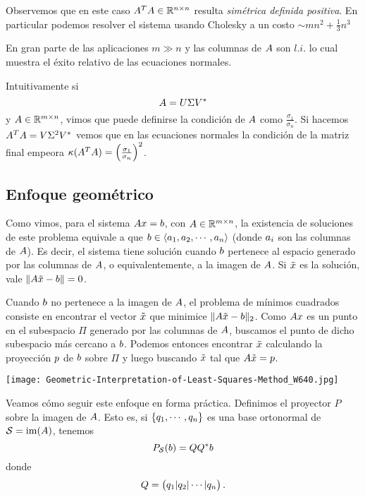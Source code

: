 Observemos que en este caso $\Ab^T\Ab\in \Rnn$ resulta \emph{simétrica definida positiva}.
En particular podemos resolver el sistema usando Cholesky a un costo $\sim mn^2+ \frac{1}{3}n^{3}$

En gran parte de las aplicaciones $m \gg n$ y las columnas de $\Ab$ son $l.i.$ lo cual muestra el éxito relativo de las ecuaciones normales.

Intuitivamente si
$$
\Ab=\Ub\Sigmab\Vb^*
$$
y $\Ab\in \R^{m\times n}$, vimos que puede definirse la condición de $\Ab$ como $\frac{\sigma_1}{\sigma_n}$. Si hacemos $\Ab^T\Ab=\Vb\Sigmab^2\Vb^*$ vemos que en las ecuaciones normales la condición de la matriz final empeora $\kappa(\Ab^T\Ab)=\left(\frac{\sigma_1}{\sigma_n}\right)^2$.


\subsection{Enfoque geométrico}

Como vimos, para el sistema $\Ab\xb=\bb$, con $\Ab\in \Rmn$, la existencia de soluciones de este problema equivale a que
$\bb\in \langle \ab_1,  \ab_2,\cdots , \ab_n\rangle$ (donde $\ab_{i}$ son las columnas de $\Ab$). Es decir, el sistema tiene solución cuando $\bb$ pertenece al espacio generado por las columnas de $\Ab$, o equivalentemente, a la imagen de $\Ab$. Si $\tilde \xb$ es la solución, vale $\|\Ab \tilde \xb - \bb\| = 0$.

Cuando $\bb$ no pertenece a la imagen de $\Ab$, el problema de mínimos cuadrados consiste en encontrar el vector $\tilde \xb$ que minimice $\|\Ab \tilde \xb - \bb\|_2$. Como $\Ab \xb$ es un punto en el subespacio $\Pi$ generado por las columnas de $\Ab$, buscamos el punto de dicho subespacio más cercano a $\bb$.
Podemos entonces encontrar $\tilde \xb$ calculando la proyección $\pb$ de $\bb$ sobre $\Pi$ y luego buscando $\tilde \xb$ tal que $\Ab \tilde \xb = \pb$.

\begin{center}
\texttt{[image: Geometric-Interpretation-of-Least-Squares-Method\_W640.jpg]}
\end{center}

Veamos cómo seguir este enfoque en forma práctica. Definimos el proyector $P$ sobre la imagen de $\Ab$. Esto es, si $\{\qb_1,\cdots,\qb_n\}$ es una base ortonormal de $\mathcal{S}=\im(\Ab)$, tenemos
$$
P_{\mathcal{S}}(\bb)=\Qb\Qb^*\bb
$$
donde
$$
\Qb=
\begin{pmatrix}
\qb_1|\qb_2|\cdots |\qb_n
\end{pmatrix}.
$$

